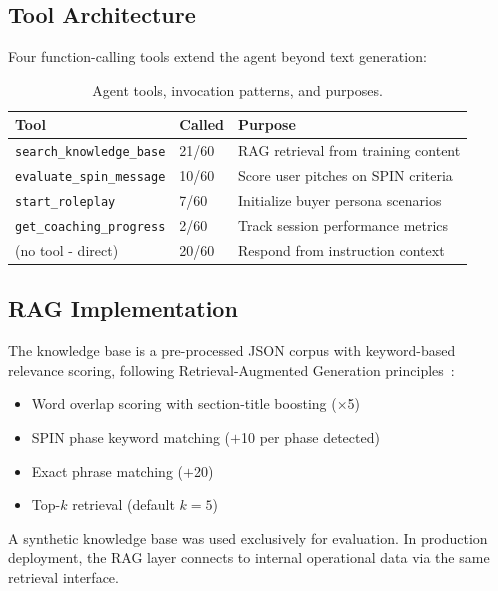 \documentclass[11pt,a4paper]{article}
\begin{document}
\subsection{Tool Architecture}

Four function-calling tools extend the agent beyond text generation:

\begin{table}[H]
\caption{Agent tools, invocation patterns, and purposes.}
\setlength{\tabcolsep}{16pt}
\renewcommand{\arraystretch}{1.4}
\begin{tabular}{l l l}
\toprule
\textbf{Tool} & \textbf{Called} & \textbf{Purpose} \\
\midrule
\texttt{search\_knowledge\_base} & 21/60 & RAG retrieval from training content \\
\texttt{evaluate\_spin\_message} & 10/60 & Score user pitches on SPIN criteria \\
\texttt{start\_roleplay} & 7/60 & Initialize buyer persona scenarios \\
\texttt{get\_coaching\_progress} & 2/60 & Track session performance metrics \\
(no tool - direct) & 20/60 & Respond from instruction context \\
\bottomrule
\end{tabular}
\end{table}

\subsection{RAG Implementation}

The knowledge base is a pre-processed JSON corpus with keyword-based relevance scoring, following Retrieval-Augmented Generation principles~\cite{lewis2020rag}:
\begin{itemize}[leftmargin=*,noitemsep,topsep=2pt]
    \item Word overlap scoring with section-title boosting ($\times$5)
    \item SPIN phase keyword matching ($+$10 per phase detected)
    \item Exact phrase matching ($+$20)
    \item Top-$k$ retrieval (default $k\!=\!5$)
\end{itemize}

A synthetic knowledge base was used exclusively for evaluation. In production deployment, the RAG layer connects to internal operational data via the same retrieval interface.
\end{document}
